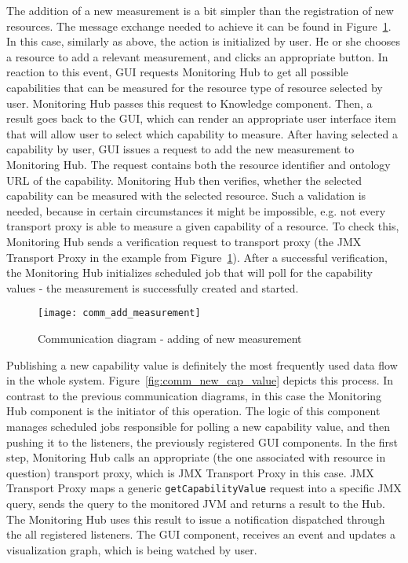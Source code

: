The addition of a new measurement is a bit simpler than the registration of new resources. The message exchange needed to achieve it can be found in Figure~\ref{fig:comm_add_measurement}. In this case, similarly as above, the action is initialized by user. He or she chooses a resource to add a relevant measurement, and clicks an appropriate button. In reaction to this event, GUI requests Monitoring Hub to get all possible capabilities that can be measured for the resource type of resource selected by user. Monitoring Hub passes this request to Knowledge component. Then, a result goes back to the GUI, which can render an appropriate user interface item that will allow user to select which capability to measure. After having selected a capability by user, GUI issues a request to add the new measurement to Monitoring Hub. The request contains both the resource identifier and ontology URL of the capability. Monitoring Hub then verifies, whether the selected capability can be measured with the selected resource. Such a validation is needed, because in certain circumstances it might be impossible, e.g. not every transport proxy is able to measure a given capability of a resource. To check this, Monitoring Hub sends a verification request to transport proxy (the JMX Transport Proxy in the example from Figure~\ref{fig:comm_add_measurement}). After a successful verification, the Monitoring Hub initializes scheduled job that will poll for the capability values - the measurement is successfully created and started.

\begin{figure}[ht]
\centering
\texttt{[image: comm\_add\_measurement]}
\caption{Communication diagram - adding of new measurement}
\label{fig:comm_add_measurement}
\end{figure}

Publishing a new capability value is definitely the most frequently used data flow in the whole system. Figure~\ref{fig:comm_new_cap_value} depicts this process. In contrast to the previous communication diagrams, in this case the Monitoring Hub component is the initiator of this operation. The logic of this component manages scheduled jobs responsible for polling a new capability value, and then pushing it to the listeners, the previously registered GUI components. In the first step, Monitoring Hub calls an appropriate (the one associated with resource in question) transport proxy, which is JMX Transport Proxy in this case. JMX Transport Proxy maps a generic \texttt{getCapabilityValue} request into a specific JMX query, sends the query to the monitored JVM and returns a result to the Hub. The Monitoring Hub uses this result to issue a notification dispatched through the all registered listeners. The GUI component, receives an event and updates a visualization graph, which is being watched by user.

